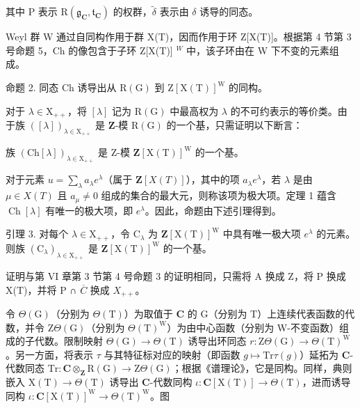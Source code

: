 其中 P 表示 \(\mathrm{R}(\mathfrak{g}_{\mathbf{C}}, \mathfrak{t}_{\mathbf{C}})\) 的权群，\(\tilde{\delta}\) 表示由 \(\delta\) 诱导的同态。

Weyl 群 W 通过自同构作用于群 X(T)，因而作用于环 Z[X(T)]。根据第 4 节第 3 号命题 5，Ch 的像包含于子环 Z[X(T)] \(^{W}\) 中，该子环由在 W 下不变的元素组成。

命题 2. 同态 \(\mathrm{Ch}\) 诱导出从 \(\mathrm{R}(\mathrm{G})\) 到 \(\mathrm{Z}[\mathrm{X}(\mathrm{T})]^{\mathrm{W}}\) 的同构。

对于 \(\lambda \in \mathrm{X}_{++}\)，将 \([\lambda]\) 记为 \(\mathrm{R}(\mathrm{G})\) 中最高权为 \(\lambda\) 的不可约表示的等价类。由于族 \(([\lambda])_{\lambda \in \mathrm{X}_{++}}\) 是 \(\mathbf{Z}\)-模 \(\mathrm{R}(\mathrm{G})\) 的一个基，只需证明以下断言：

族 \((\mathrm{Ch}[\lambda])_{\lambda\in\mathrm{X}_{++}}\) 是 Z-模 \(\mathbf{Z}[\mathrm{X}(\mathrm{T})]^{\mathrm{W}}\) 的一个基。

对于元素 \(u = \sum_{\lambda} a_{\lambda} e^{\lambda}\)（属于 \(\mathbf{Z}[X(T)]\)），其中的项 \(a_{\lambda} e^{\lambda}\)，若 \(\lambda\) 是由 \(\mu \in X(T)\) 且 \(a_{\mu} \neq 0\) 组成的集合的最大元，则称该项为极大项。定理 1 蕴含 \(\operatorname{Ch}[\lambda]\) 有唯一的极大项，即 \(e^{\lambda}\)。因此，命题由下述引理得到。

引理 3. 对每个 \(\lambda \in \mathrm{X}_{++}\)，令 \(\mathrm{C}_{\lambda}\) 为 \(\mathbf{Z}[\mathrm{X(T)}]^{\mathrm{W}}\) 中具有唯一极大项 \(e^{\lambda}\) 的元素。则族 \((\mathrm{C}_{\lambda})_{\lambda \in \mathrm{X}_{++}}\) 是 \(\mathbf{Z}[\mathrm{X(T)}]^{\mathrm{W}}\) 的一个基。

证明与第 VI 章第 3 节第 4 号命题 3 的证明相同，只需将 A 换成 Z，将 P 换成 X(T)，并将 P ∩ \(\overline{C}\) 换成 \(X_{++}\)。

令 \(\Theta (\mathrm{G})\)（分别为 \(\Theta (\mathrm{T})\)）为取值于 \(\mathbf{C}\) 的 \(\mathrm{G}\)（分别为 T）上连续代表函数的代数，并令 \(\mathrm{Z}\Theta (\mathrm{G})\)（分别为 \(\Theta (\mathrm{T})^{\mathrm{W}}\)）为由中心函数（分别为 W-不变函数）组成的子代数。限制映射 \(\Theta (\mathrm{G})\to \Theta (\mathrm{T})\) 诱导出环同态 \(r:\mathrm{Z}\Theta (\mathrm{G})\rightarrow \Theta (\mathrm{T})^{\mathrm{W}}\)。另一方面，将表示 \(\tau\) 与其特征标对应的映射（即函数 \(g\mapsto \mathrm{Tr}\tau (g)\)）延拓为 \(\mathbf{C}\)-代数同态 \(\mathrm{Tr}:\mathbf{C}\otimes_{\mathbf{Z}}\mathrm{R}(\mathrm{G})\to \mathrm{Z}\Theta (\mathrm{G})\)；根据《谱理论》，它是同构。同样，典则嵌入 \(\mathrm{X(T)}\to \Theta (\mathrm{T})\) 诱导出 \(\mathbf{C}\)-代数同构 \(\iota :\mathbf{C}[\mathrm{X(T)}]\to \Theta (\mathrm{T})\)，进而诱导同构 \(\iota :\mathbf{C}[\mathrm{X(T)}]^{\mathrm{W}}\to \Theta (\mathrm{T})^{\mathrm{W}}\)。图

